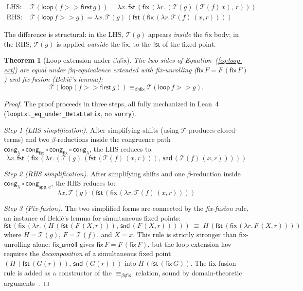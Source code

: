 \documentclass[11pt,a4paper]{article}
\newtheorem{theorem}{Theorem}
\theoremstyle{definition}
\theoremstyle{remark}
\newcommand{\comp}{\mathbin{>\!\!>}}
\newcommand{\first}{\mathsf{first}}
\newcommand{\loopop}{\mathsf{loop}}
\newcommand{\fix}{\mathsf{fix}}
\newcommand{\T}{\mathcal{T}}
\newcommand{\betetafix}{\equiv_{\beta\eta\fix}}
\begin{document}
\begin{align}
  \text{LHS: } & \T(\loopop(f \comp \first\,g))
    = \lambda x.\, \mathsf{fst}\,(\fix\,(\lambda r.\, (\T(g)\,(\T(f)\,x),\, r)))
    \label{eq:loop-lhs} \\
  \text{RHS: } & \T(\loopop\,f \comp g)
    = \lambda x.\, \T(g)\,(\mathsf{fst}\,(\fix\,(\lambda r.\, \T(f)\,(x, r))))
    \label{eq:loop-rhs}
\end{align}

The difference is structural: in the LHS, $\T(g)$ appears \emph{inside} the
$\fix$ body; in the RHS, $\T(g)$ is applied \emph{outside} the $\fix$, to
the $\mathsf{fst}$ of the fixed point.

\begin{theorem}[Loop extension under $\beta\eta\fix$]\label{thm:loop-fix}
The two sides of Equation~(\ref{eq:loop-ext}) are equal under $\beta\eta$-equivalence
extended with fix-unrolling ($\fix\,F = F\,(\fix\,F)$) and fix-fusion
(Beki\'c's lemma):
\[
  \T(\loopop(f \comp \first\,g)) \betetafix \T(\loopop\,f \comp g).
\]
\end{theorem}

\begin{proof}[Proof]
The proof proceeds in three steps, all fully mechanized in Lean~4
(\texttt{loopExt\_eq\_under\_BetaEtaFix}, no \texttt{sorry}).

\emph{Step 1 (LHS simplification).}
After simplifying shifts (using $\T$-produces-closed-terms) and two
$\beta$-reductions inside the congruence path
$\mathsf{cong}_{\lambda} \circ \mathsf{cong}_{\mathsf{fst}}
\circ \mathsf{cong}_{\fix} \circ \mathsf{cong}_{\lambda}$,
the LHS reduces to:
\[
  \lambda x.\, \mathsf{fst}\,(\fix\,(\lambda r.\,
    (\T(g)\,(\mathsf{fst}\,(\T(f)\,(x, r))),\,
     \mathsf{snd}\,(\T(f)\,(x, r)))))
\]

\emph{Step 2 (RHS simplification).}
After simplifying shifts and one $\beta$-reduction inside
$\mathsf{cong}_{\lambda} \circ \mathsf{cong}_{\mathsf{app},a}$,
the RHS reduces to:
\[
  \lambda x.\, \T(g)\,(\mathsf{fst}\,(\fix\,(\lambda r.\, \T(f)\,(x, r))))
\]

\emph{Step 3 (Fix-fusion).}
The two simplified forms are connected by the \emph{fix-fusion} rule,
an instance of Beki\'c's lemma for simultaneous fixed points:
\[
  \mathsf{fst}\,(\fix\,(\lambda r.\, (H\,(\mathsf{fst}\,(F\,(X, r))),\, \mathsf{snd}\,(F\,(X, r)))))
  \;\equiv\;
  H\,(\mathsf{fst}\,(\fix\,(\lambda r.\, F\,(X, r))))
\]
where $H = \T(g)$, $F = \T(f)$, and $X = x$. This rule is strictly
stronger than fix-unrolling alone: $\mathsf{fix\_unroll}$ gives
$\fix\,F = F\,(\fix\,F)$, but the loop extension law requires the
\emph{decomposition} of a simultaneous fixed point
$(H\,(\mathsf{fst}\,(G(r))),\, \mathsf{snd}\,(G(r)))$ into
$H\,(\mathsf{fst}\,(\fix\,G))$. The fix-fusion rule is added as a
constructor of the $\betetafix$ relation, sound by domain-theoretic
arguments~\cite{bekic1960s,winskel}.
\end{proof}
\end{document}

